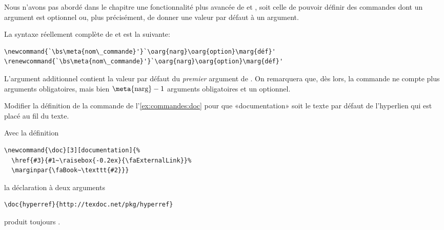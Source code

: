 \begin{exercice}
  Nous n'avons pas abordé dans le chapitre une fonctionnalité plus
  avancée de \cmd{\newcommand} et \cmd{\renewcommand}, soit celle de
  pouvoir définir des commandes dont un argument est optionnel ou,
  plus précisément, de donner une valeur par défaut à un argument.

  La syntaxe réellement complète de \cmd{\newcommand} et
  \cmd{\renewcommand} est la suivante:
\begin{lstlisting}
\newcommand{`\bs\meta{nom\_commande}'}`\oarg{narg}\oarg{option}\marg{déf}'
\renewcommand{`\bs\meta{nom\_commande}'}`\oarg{narg}\oarg{option}\marg{déf}'
\end{lstlisting}
  L'argument additionnel  contient la valeur par défaut
  du \emph{premier} argument de \bs{}. On remarquera
  que, dès lors, la commande ne compte plus  arguments
  obligatoires, mais bien $\text{\meta{narg}} - 1$ arguments
  obligatoires et un optionnel.

  Modifier la définition de la commande \cmdprint{\doc} de
  l'\autoref{ex:commandes:doc} pour que «documentation» soit le texte
  par défaut de l'hyperlien qui est placé au fil du texte.
  \begin{sol}
    Avec la définition
\begin{lstlisting}
\newcommand{\doc}[3][documentation]{%
  \href{#3}{#1~\raisebox{-0.2ex}{\faExternalLink}}%
  \marginpar{\faBook~\texttt{#2}}}
\end{lstlisting}
    la déclaration à deux arguments
\begin{lstlisting}
\doc{hyperref}{http://texdoc.net/pkg/hyperref}
\end{lstlisting}
    produit toujours .
  \end{sol}
\end{exercice}

